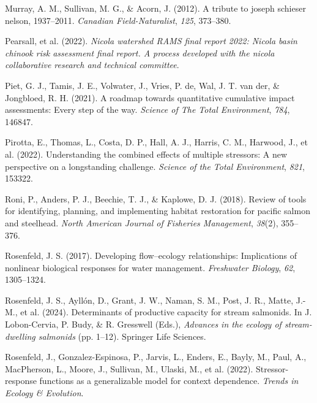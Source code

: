 \documentclass[
  letterpaper,
  DIV=11,
  numbers=noendperiod]{scrreprt}
\newlength{\cslhangindent}
\newenvironment{CSLReferences}[2] %
 {\begin{list}{}{%
  \setlength{\itemindent}{0pt}
  \setlength{\leftmargin}{0pt}
  \setlength{\parsep}{0pt}
  \ifodd #1
   \setlength{\leftmargin}{\cslhangindent}
   \setlength{\itemindent}{-1\cslhangindent}
  \fi
  \setlength{\itemsep}{#2\baselineskip}}}
 {\end{list}}
\begin{document}
\begin{CSLReferences}{1}{0}
Murray, A. M., Sullivan, M. G., \& Acorn, J. (2012). A tribute to joseph
schieser nelson, 1937--2011. \emph{Canadian Field-Naturalist},
\emph{125}, 373--380.

Pearsall, et al. (2022). \emph{Nicola watershed RAMS final report 2022:
Nicola basin chinook risk assessment final report. A process developed
with the nicola collaborative research and technical committee}.

Piet, G. J., Tamis, J. E., Volwater, J., Vries, P. de, Wal, J. T. van
der, \& Jongbloed, R. H. (2021). A roadmap towards quantitative
cumulative impact assessments: Every step of the way. \emph{Science of
The Total Environment}, \emph{784}, 146847.

Pirotta, E., Thomas, L., Costa, D. P., Hall, A. J., Harris, C. M.,
Harwood, J., et al. (2022). Understanding the combined effects of
multiple stressors: A new perspective on a longstanding challenge.
\emph{Science of the Total Environment}, \emph{821}, 153322.

Roni, P., Anders, P. J., Beechie, T. J., \& Kaplowe, D. J. (2018).
Review of tools for identifying, planning, and implementing habitat
restoration for pacific salmon and steelhead. \emph{North American
Journal of Fisheries Management}, \emph{38}(2), 355--376.

Rosenfeld, J. S. (2017). Developing flow--ecology relationships:
Implications of nonlinear biological responses for water management.
\emph{Freshwater Biology}, \emph{62}, 1305--1324.

Rosenfeld, J. S., Ayllón, D., Grant, J. W., Naman, S. M., Post, J. R.,
Matte, J.-M., et al. (2024). Determinants of productive capacity for
stream salmonids. In J. Lobon-Cervia, P. Budy, \& R. Gresswell (Eds.),
\emph{Advances in the ecology of stream-dwelling salmonids} (pp. 1--12).
Springer Life Sciences.

Rosenfeld, J., Gonzalez-Espinosa, P., Jarvis, L., Enders, E., Bayly, M.,
Paul, A., MacPherson, L., Moore, J., Sullivan, M., Ulaski, M., et al.
(2022). Stressor-response functions as a generalizable model for context
dependence. \emph{Trends in Ecology \& Evolution}.


\end{CSLReferences}
\end{document}

